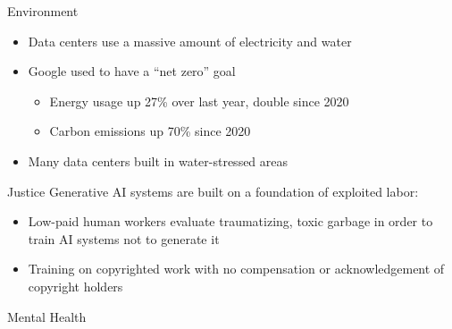 \documentclass[xcolor={usenames,dvipsnames,svgnames,table},12pt]{beamer}
\begin{document}
\begin{frame}{Environment}
  \begin{itemize}
  \item Data centers use a massive amount of electricity and water
  \item Google used to have a ``net zero'' goal
    \begin{itemize}
    \item Energy usage up 27\% over last year, double since 2020
    \item Carbon emissions up 70\% since 2020
    \end{itemize}
  \item Many data centers built in water-stressed areas
  \end{itemize}
\end{frame}

\begin{frame}{Justice}
Generative AI systems are built on a foundation of exploited labor:
  \begin{itemize}
  \item Low-paid human workers evaluate traumatizing, toxic
    garbage in order to train AI systems not to generate it
  \item Training on copyrighted work with no compensation or
    acknowledgement of copyright holders
  \end{itemize}
\end{frame}

\begin{frame}{Mental Health}
\end{frame}
\end{document}
